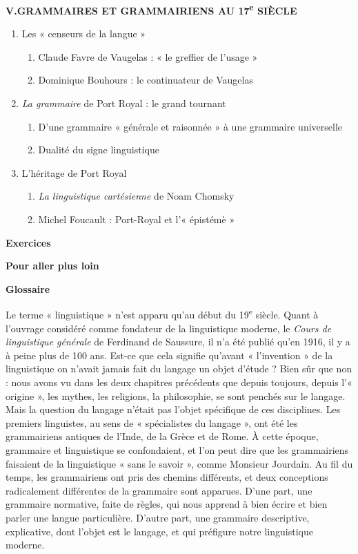 \begin{keybox}
\begin{enumerate}[label=\arabic*.,start=2]
\begin{enumerate}[label=\textcircled{\scriptsize\arabic*}]
\end{enumerate}
\end{enumerate}
\textbf{V.\quad GRAMMAIRES ET GRAMMAIRIENS AU 17\textsuperscript{e} SIÈCLE}
\begin{enumerate}[label=\arabic*.]
\item Les « censeurs de la langue »
\begin{enumerate}[label=\textcircled{\scriptsize\arabic*}]
\item Claude Favre de Vaugelas : « le greffier de l’usage »
\item Dominique Bouhours : le continuateur de Vaugelas
\end{enumerate}
\item \textit{La grammaire} de Port Royal : le grand tournant
\begin{enumerate}[label=\textcircled{\scriptsize\arabic*}]
\item D’une grammaire « générale et raisonnée » à une grammaire universelle
\item Dualité du signe linguistique
\end{enumerate}
\item L’héritage de Port Royal
\begin{enumerate}[label=\textcircled{\scriptsize\arabic*}]
\item \textit{La linguistique cartésienne} de Noam Chomsky
\item Michel Foucault : Port-Royal et l’« épistémè »
\end{enumerate}
\end{enumerate}
\textbf{Exercices}\par
\textbf{Pour aller plus loin}\par
\textbf{Glossaire}
\end{keybox}
\clearpage
{}
Le terme « linguistique » n’est apparu qu’au début du 19\textsuperscript{e} siècle. Quant à l’ouvrage considéré comme fondateur de la linguistique moderne, le \textit{Cours de linguistique générale} de Ferdinand de Saussure, il n’a été publié qu’en 1916, il y a à peine plus de 100 ans. Est-ce que cela signifie qu’avant « l’invention » de la linguistique on n’avait jamais fait du langage un objet d’étude ? Bien sûr que non : nous avons vu dans les deux chapitres précédents que depuis toujours, depuis l’« origine », les mythes, les religions, la philosophie, se sont penchés sur le langage. Mais la question du langage n’était pas l’objet spécifique de ces disciplines. Les premiers linguistes, au sens de « spécialistes du langage », ont été les grammairiens antiques de l’Inde, de la Grèce et de Rome. À cette époque, grammaire et linguistique se confondaient, et l’on peut dire que les grammairiens faisaient de la linguistique « sans le savoir », comme Monsieur Jourdain. Au fil du temps, les grammairiens ont pris des chemins différents, et deux conceptions radicalement différentes de la grammaire sont apparues. D’une part, une grammaire normative, faite de règles, qui nous apprend à bien écrire et bien parler une langue particulière. D’autre part, une grammaire descriptive, explicative, dont l’objet est le langage, et qui préfigure notre linguistique moderne.
